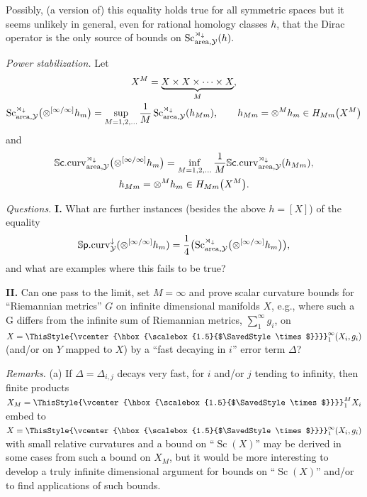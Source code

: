 \documentclass[pdftex]{sigma}
\numberwithin{equation}{section}
\newcommand\bigtimes{\mathbin{\ThisStyle{\vcenter{\hbox{%
\scalebox{1.5}{$\SavedStyle\times$}}}}}}
\begin{document}
Possibly, (a version of) this equality holds true for all symmetric spaces but it seems unlikely in general, even for rational homology classes $h$, that the Dirac operator
 is the only source of bounds on $\operatorname{Sc}^{\rtimes _\downarrow}_{{\rm area},\mathcal Y }(h).$

{\it Power stabilization.} Let
\begin{gather*}
X^M= \underset {M}{ \underbrace {X\times X\times \cdots \times X}},\\
\operatorname{Sc}^{\rtimes _\downarrow}_{{\rm area},\mathcal Y }\bigl(\otimes ^{[\infty/\infty]}h_m\bigr)=\sup_{M=1,2,\dots}\frac {1}{M} \operatorname{Sc}^{\rtimes _\downarrow}_{{\rm area},\mathcal Y }(h_{Mm}),\qquad  h_{Mm}=
\otimes^M h_m\in H_{Mm}\bigl(X^M\bigr)
\end{gather*}
and
\begin{gather*}
\mathbb S\mbox{\sf c}.{\rm curv}^{\rtimes _\downarrow}_{{\rm area},\mathcal Y }\bigl(\otimes ^{[\infty/\infty]}h_m\bigr)=\inf_{M=1,2,\dots }\frac {1}{M} \mathbb S\mbox{\sf c}.{\rm curv}^{\rtimes _\downarrow}_{{\rm area},\mathcal Y }(h_{Mm}),\\
h_{Mm}= \otimes^M h_m\in H_{Mm}\bigl(X^M\bigr).
\end{gather*}

{\it Questions.} \textbf{I.} What are further instances (besides the above $h=[X]$) of the equality
\[
\mathbb S\mbox{\sf p}.{\rm curv}^\downarrow _{\mathcal Y}(\otimes ^{[\infty/\infty]}h_m)=\frac{1}{4} \bigl(\operatorname{Sc}^{\rtimes _\downarrow}_{{\rm area},\mathcal Y }\bigl(\otimes ^{[\infty/\infty]}h_m\bigr)\bigr),
\]
and what are examples where this fails to be true?

 \textbf{II.} Can one pass to the limit, set $M=\infty$ and prove scalar curvature bounds for
``Riemannian metrics'' $G$ on infinite dimensional manifolds $X$, e.g., where such a G differs from the infinite sum of Riemannian metrics, $\sum_1^\infty g_i$, on $X=\bigtimes_1^\infty(X_i,g_i)$ (and/or on $Y$ mapped to $X$) by a ``fast decaying in
$i$'' error term $\Delta$?

 {\it Remarks.} (a) If $\Delta=\Delta_{i,j}$ decays very fast, for $i$ and/or $j$ tending to infinity, then finite products $X_M=\bigtimes_1^M X_i$ embed to
$X= \bigtimes_1^\infty(X_i,g_i)$ with small relative curvatures and a bound on ``$\operatorname{Sc}(X)$'' may be derived in some cases from such a bound on $X_M$, but it would be more interesting to develop a
 truly infinite dimensional argument for bounds on ``$\operatorname{Sc}(X)$'' and/or to find applications of such
 bounds.
\end{document}
